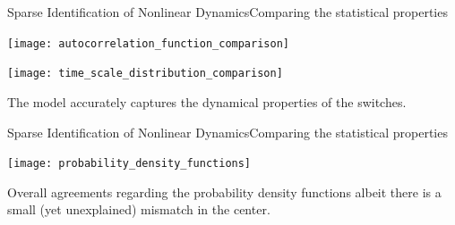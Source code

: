     
    
  


\begin{frame}[t, c]{Sparse Identification of Nonlinear Dynamics}{Comparing the statistical properties}
  \begin{minipage}{.48\textwidth}
    \centering
    \texttt{[image: autocorrelation\_function\_comparison]}

  \end{minipage}%
  \hfill
  \begin{minipage}{.48\textwidth}
    \texttt{[image: time\_scale\_distribution\_comparison]}
  \end{minipage}

  \bigskip
  
  \centering
  The model accurately captures the dynamical properties of the switches.
  
  \vspace{1cm}
\end{frame}

\begin{frame}[t, c]{Sparse Identification of Nonlinear Dynamics}{Comparing the statistical properties}

  \begin{center}
    \texttt{[image: probability\_density\_functions]}
  \end{center}

  \medskip

  Overall agreements regarding the probability density functions albeit there is a small (yet unexplained) mismatch in the center.
  \vspace{1cm}
\end{frame}

      
